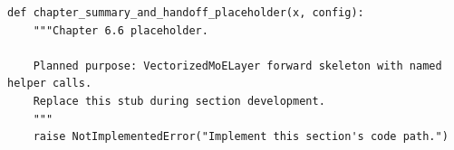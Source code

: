 \begin{lstlisting}[style=bookpython,caption={Planned code placeholder for chapter summary and handoff.},label={lst:ch06-chapter-summary-and-handoff}]
def chapter_summary_and_handoff_placeholder(x, config):
    """Chapter 6.6 placeholder.

    Planned purpose: VectorizedMoELayer forward skeleton with named helper calls.
    Replace this stub during section development.
    """
    raise NotImplementedError("Implement this section's code path.")
\end{lstlisting}
